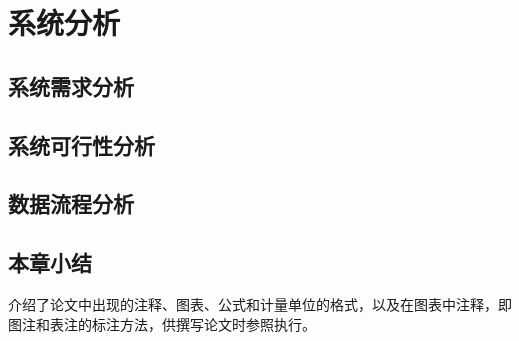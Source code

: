 
\chapter{系统分析}
\section{系统需求分析}



\section{系统可行性分析}


\section{数据流程分析}


\section{本章小结}

介绍了论文中出现的注释、图表、公式和计量单位的格式，以及在图表中注释，即图注和表注的标注方法，供撰写论文时参照执行。 
